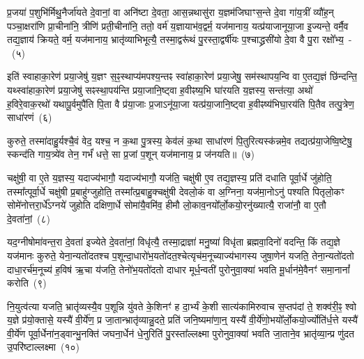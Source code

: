 प्र॒जया॑ प॒शुभि॑र्मिथु॒नैर्जा॑यते दे॒वानां॒ वा अनि॑ष्टा दे॒वता॒ आस॒\-न्नथा\-सु॑रा य॒ज्ञम॑\-जिघाꣳस॒न्ते दे॒वा गा॑य॒त्रीं व्यौ॑ह॒न् पञ्चा॒क्षरा॑णि प्रा॒ची\-ना॑नि॒ त्रीणि॑ प्रती॒चीना॑नि॒ ततो॒ वर्म॑ य॒ज्ञायाभ॑व॒द्वर्म॒ यज॑मानाय॒ यत्प्र॑या\-जा\-नू\-या॒जा इ॒ज्यन्ते॒ वर्मै॒व तद्य॒ज्ञाय॑ क्रियते॒ वर्म॒ यज॑मानाय॒ भ्रातृ॑व्या\-भिभूत्यै॒ तस्मा॒द्वरू॑थं पु॒रस्ता॒द्वर्\mbox{}षी॑यः प॒श्चाद्ध्रसी॑यो दे॒वा वै पु॒रा रक्षो᳚भ्य॒~-~(५)\ip

इति॑ स्वाहा\-का॒रेण॑ प्रया॒जेषु॑ य॒ज्ञꣳ स॒ꣴ॒स्थाप्य॑मपश्य॒न्तꣴ स्वा॑हा\-का॒रेण॑ प्रया॒जेषु॒ सम॑स्थापय॒न्वि वा ए॒तद्य॒ज्ञं छि॑न्दन्ति॒ यथ्\-स्वा॑हा\-का॒रेण॑ प्रया॒जेषु॑ सꣴस्था॒पय॑न्ति प्रया॒जानि॒ष्ट्वा ह॒वीꣴष्य॒भि घा॑रयति य॒ज्ञस्य॒ सन्त॑त्या॒ अथो॑ ह॒विरे॒वाक॒रथो॑ यथापू॒र्वमुपै॑ति पि॒ता वै प्र॑या॒जाः प्र॒जा\-ऽनू॑या॒जा यत्प्र॑या॒जानि॒ष्ट्वा ह॒वीꣴष्य॑भिघा॒रय॑ति पि॒तैव तत्पु॒त्रेण॒ साधा॑रणं~(६)\ip

कुरुते॒ तस्मा॑दाहु॒र्यश्चै॒वं वेद॒ यश्च॒ न क॒था पु॒त्रस्य॒ केव॑लं क॒था साधा॑रणं पि॒तुरित्यस्क॑न्नमे॒व तद्यत्प्र॑या॒जेष्वि॒ष्टेषु॒ स्कन्द॑ति गाय॒त्र्ये॑व तेन॒ गर्भं॑ धत्ते॒ सा प्र॒जां प॒शून् यज॑मानाय॒ प्र ज॑नयति॥~(७)\ip

{}

चक्षु॑षी॒ वा ए॒ते य॒ज्ञस्य॒ यदाज्य॑भागौ॒ यदाज्य॑भागौ॒ यज॑ति॒ चक्षु॑षी ए॒व तद्य॒ज्ञस्य॒ प्रति॑ दधाति पूर्वा॒र्धे जु॑होति॒ तस्मा᳚त्पूर्वा॒र्धे चक्षु॑षी प्र॒बाहु॑ग्जुहोति॒ तस्मा᳚त्प्र॒बाहु॒क्चक्षु॑षी देवलो॒कं वा अ॒ग्निना॒ यज॑मा॒नो\-ऽनु॑ पश्यति पितृलो॒कꣳ सोमे॑नोत्तरा॒र्धे᳚\-ऽग्नये॑ जुहोति दक्षिणा॒र्धे सोमा॑यै॒वमि॑व॒ हीमौ लो॒काव॒नयो᳚र्लो॒कयो॒रनु॑ख्यात्यै॒ राजा॑नौ॒ वा ए॒तौ दे॒वता॑नां॒~(८)\ip

यद॒ग्नी\-षोमा॑वन्त॒रा दे॒वता॑ इज्येते दे॒वता॑नां॒ विधृ॑त्यै॒ तस्मा॒द्राज्ञा॑ मनु॒ष्या॑ विधृ॑ता ब्रह्मवा॒दिनो॑ वदन्ति॒ किं तद्य॒ज्ञे यज॑मानः कुरुते॒ येना॒न्यतो॑दतश्च प॒शून्दा॒धारो॑भ॒यतो॑\-दत॒श्चेत्यृच॑\-म॒नूच्याज्य॑\-भागस्य जुषा॒णेन॑ यजति॒ तेना॒न्यतो॑दतो दाधा॒रर्च॑म॒नूच्य॑ ह॒विष॑ ऋ॒चा य॑जति॒ तेनो॑भ॒यतो॑दतो दाधार मूर्ध॒न्वती॑ पुरोनुवा॒क्या॑ भवति मू॒र्धान॑मे॒वैनꣳ॑ समा॒नानां᳚ करोति~(९)\ip

नि॒युत्व॑त्या यजति॒ भ्रातृ॑व्यस्यै॒व प॒शून्नि यु॑वते के॒शिनꣳ॑ ह दा॒र्भ्यं के॒शी सात्य॑कामिरुवाच स॒प्तप॑दां ते॒ शक्व॑री॒ꣴ॒ श्वो य॒ज्ञे प्र॑यो॒क्तासे॒ यस्यै॑ वी॒र्ये॑ण॒ प्र जा॒तान्भ्रातृ॑व्यान्नु॒दते॒ प्रति॑ जनि॒ष्यमा॑णा॒न्॒ यस्यै॑ वी॒र्ये॑णो॒भयो᳚र्लो॒कयो॒र्ज्योति॑र्ध॒त्ते यस्यै॑ वी॒र्ये॑ण पूर्वा॒र्धेना॑न॒ड्वान्भु॒नक्ति॑ जघना॒र्धेन॑ धे॒नुरिति॑ पु॒रस्ता᳚ल्लक्ष्मा पुरोनुवा॒क्या॑ भवति जा॒ताने॒व भ्रातृ॑व्या॒न्प्र णु॑दत उ॒परि॑ष्टाल्लक्ष्मा~(१०)\ip

